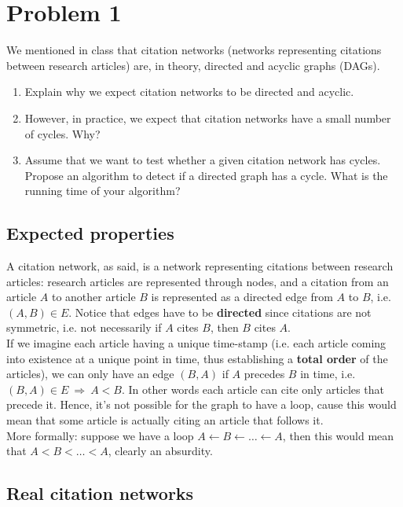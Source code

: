 
\section{Problem 1}

We mentioned in class that citation networks (networks representing
citations between research articles) are, in theory, directed and
acyclic graphs (DAGs).
\begin{enumerate}
	\item Explain why we expect citation networks to be directed and acyclic.
	\item However, in practice, we expect that citation networks have a small
	number of cycles. Why?
	\item Assume that we want to test whether a given citation network has
	cycles. Propose an algorithm to detect if a directed graph has a
	cycle. What is the running time of your algorithm?
\end{enumerate}


\subsection{Expected properties}

A citation network, as said, is a network representing citations between
research articles: research articles are represented through nodes, and
a citation from an article $A$ to another
article $B$ is represented as a directed edge from
$A$ to $B$, i.e. $\left(A,B\right) \in E$. Notice that
edges have to be \textbf{directed} since citations are not symmetric,
i.e. not necessarily if $A$ cites $B$, then
$B$ cites $A$.\\
If we imagine each article having a unique time-stamp (i.e. each article
coming into existence at a unique point in time, thus establishing
a \textbf{total order} of the articles), we can only have an edge
$\left(B, A\right)$ if $A$ precedes $B$ in time,
i.e. $\left(B,A\right) \in E \ \Rightarrow \ A<B$. In other words each article can cite only
articles that precede it. Hence, it's not possible for the graph to have a loop, cause this would
mean that some article is actually citing an article that follows it.\\
More formally: suppose we have a loop $A \leftarrow B \leftarrow \dots \leftarrow A$, then this would mean that $A < B < \dots < A$, clearly an absurdity.

\subsection{Real citation networks}

